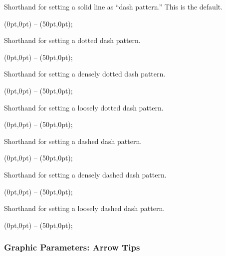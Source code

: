 \begin{itemize}
  Shorthand for setting a solid line as ``dash pattern.'' This is the default.

\begin{codeexample}[]
\tikz \draw[solid] (0pt,0pt) -- (50pt,0pt);
\end{codeexample}

  Shorthand for setting a dotted dash pattern.

\begin{codeexample}[]
\tikz \draw[dotted] (0pt,0pt) -- (50pt,0pt);
\end{codeexample}

  Shorthand for setting a densely dotted dash pattern.

\begin{codeexample}[]
\tikz {} (0pt,0pt) -- (50pt,0pt);
\end{codeexample}

  Shorthand for setting a loosely dotted dash pattern.

\begin{codeexample}[]
\tikz {} (0pt,0pt) -- (50pt,0pt);
\end{codeexample}

  Shorthand for setting a dashed dash pattern.

\begin{codeexample}[]
\tikz \draw[dashed] (0pt,0pt) -- (50pt,0pt);
\end{codeexample}

  Shorthand for setting a densely dashed dash pattern.

\begin{codeexample}[]
\tikz {} (0pt,0pt) -- (50pt,0pt);
\end{codeexample}

  Shorthand for setting a loosely dashed dash pattern.

\begin{codeexample}[]
\tikz {} (0pt,0pt) -- (50pt,0pt);
\end{codeexample}
\end{itemize}




\subsubsection{Graphic Parameters: Arrow Tips}

